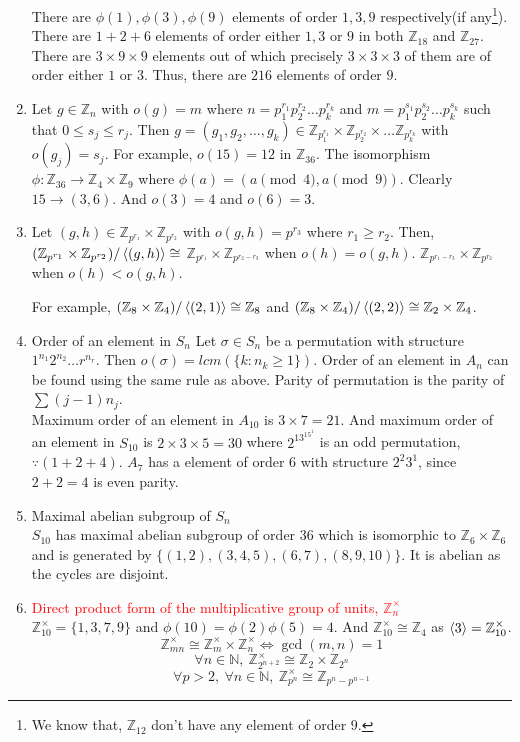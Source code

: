 \begin{enumerate}
	There are $\phi(1),\phi(3),\phi(9)$ elements of order $1,3,9$ respectively(if any\footnote{We know that, $\mathbb{Z}_{12}$ don't have any element of order $9$.}).
	There are $1+2+6$ elements of order either $1,3$ or $9$ in both $\mathbb{Z}_{18}$ and $\mathbb{Z}_{27}$.
	There are $3 \times 9 \times 9$ elements out of which precisely $3 \times 3 \times 3$ of them are of order either $1$ or $3$.
	Thus, there are $216$ elements of order $9$.
	\item Let $g \in \mathbb{Z}_n$ with $o(g) = m$ where $n=p_1^{r_1}p_2^{r_2}\dots p_k^{r_k}$ and $m = p_1^{s_1}p_2^{s_2}\dots p_k^{s_k}$ such that $0 \le s_j \le r_j$.
	Then $g = (g_1,g_2,\dots,g_k) \in \mathbb{Z}_{p_1^{r_1}} \times \mathbb{Z}_{p_2^{r_2}} \times \dots \mathbb{Z}_{p_k^{r_k}}$ with $o(g_j) = s_j$.
		For example, $o(15) = 12$ in $\mathbb{Z}_{36}$. The isomorphism $\phi : \mathbb{Z}_{36} \to \mathbb{Z}_4 \times \mathbb{Z}_9$ where $\phi(a) = (a\pmod{4},a\pmod{9})$.
	Clearly $15 \to (3,6)$. And $o(3) = 4$ and $o(6)=3$.
	\item Let $(g,h) \in \mathbb{Z}_{p^{r_1}} \times \mathbb{Z}_{p^{r_2}}$ with $o(g,h) = p^{r_3}$ where $r_1 \ge r_2$. Then, $(\mathbb{Z}_{p^{r_1}} \times \mathbb{Z}_{p^{r_2}})/\left\langle (g,h) \right\rangle \cong $
		\subitem $\mathbb{Z}_{p^{r_1}} \times \mathbb{Z}_{p^{r_2-r_3}}$ when $o(h) = o(g,h)$.
		\subitem $\mathbb{Z}_{p^{r_1-r_3}} \times \mathbb{Z}_{p^{r_2}}$ when $o(h) < o(g,h)$.

		For example, $(\mathbb{Z}_8 \times \mathbb{Z}_4)/\left\langle (2,1) \right\rangle \cong \mathbb{Z}_8$ and $(\mathbb{Z}_8 \times \mathbb{Z}_4)/\left\langle (2,2) \right\rangle \cong \mathbb{Z}_2 \times \mathbb{Z}_4$.
	\item Order of an element in $S_n$
		Let $\sigma \in S_n$ be a permutation with structure $1^{n_1}2^{n_2}\dots r^{n_r}$.
		Then $o(\sigma) = lcm(\{k : n_k \ge 1 \})$.
		Order of an element in $A_n$ can be found using the same rule as above. Parity of permutation is the parity of $\sum (j-1)n_j$.\\
		Maximum order of an element in $A_{10}$ is $3 \times 7 = 21$. And maximum order of an element in $S_{10}$ is $2 \times 3 \times 5 = 30$ where $2^13^15^1$ is an odd permutation, $\because (1+2+4)$.
		\subitem $A_7$ has a element of order $6$ with structure $2^2 3^1$, since $2+2 = 4$ is even parity.
	\item Maximal abelian subgroup of $S_n$\\
		$S_{10}$ has maximal abelian subgroup of order $36$ which is isomorphic to $\mathbb{Z}_6 \times \mathbb{Z}_6$ and is generated by $\{ (1,2),(3,4,5),(6,7),(8,9,10)\}$. It is abelian as the cycles are disjoint.
	\item \textcolor{red}{Direct product form of the multiplicative group of units, $\mathbb{Z}_n^\times$}\\
	$\mathbb{Z}_{10}^\times=\{1,3,7,9\}$ and $\phi(10)=\phi(2)\phi(5)=4$.
		And $\mathbb{Z}_{10}^\times \cong \mathbb{Z}_4$ as $\left\langle 3 \right\rangle = \mathbb{Z}_{10}^\times$.
		$$\mathbb{Z}_{mn}^\times \cong \mathbb{Z}_m^\times \times \mathbb{Z}_n^\times \iff \gcd(m,n) = 1$$
		$$\forall n \in \mathbb{N},\ \mathbb{Z}_{2^{n+2}}^\times \cong \mathbb{Z}_2 \times \mathbb{Z}_{2^n}$$
		$$\forall p > 2,\ \forall n \in \mathbb{N},\ \mathbb{Z}_{p^n}^\times \cong \mathbb{Z}_{p^n-p^{n-1}}$$


\end{enumerate}
